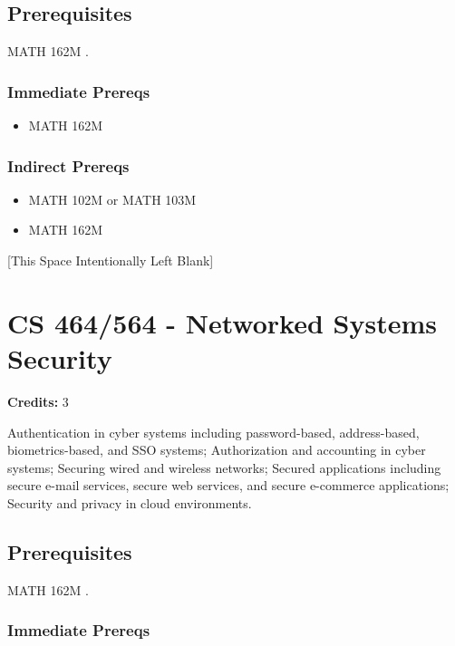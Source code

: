 \documentclass[]{article}
\providecommand{\tightlist}{%
  \setlength{\itemsep}{0pt}\setlength{\parskip}{0pt}}
\newcommand{\pagebreakhere}{
\vspace*{\fill}
\begin{center}
[This Space Intentionally Left Blank]
\end{center}
\vspace*{\fill}
\newpage
}
\begin{document}
\subsection{Prerequisites}\label{prerequisites-40}

MATH 162M .

\subsubsection{Immediate Prereqs}\label{immediate-prereqs-31}

\begin{itemize}
\tightlist
\item
  MATH 162M
\end{itemize}

\subsubsection{Indirect Prereqs}\label{indirect-prereqs-31}

\begin{itemize}
\tightlist
\item
  MATH 102M or MATH 103M
\item
  MATH 162M
\end{itemize}

\pagebreakhere
\section{CS 464/564 - Networked Systems
Security}\label{cs-464564---networked-systems-security}

\textbf{Credits:} 3

Authentication in cyber systems including password-based, address-based,
biometrics-based, and SSO systems; Authorization and accounting in cyber
systems; Securing wired and wireless networks; Secured applications
including secure e-mail services, secure web services, and secure
e-commerce applications; Security and privacy in cloud environments.

\subsection{Prerequisites}\label{prerequisites-41}

MATH 162M .

\subsubsection{Immediate Prereqs}\label{immediate-prereqs-32}
\end{document}
